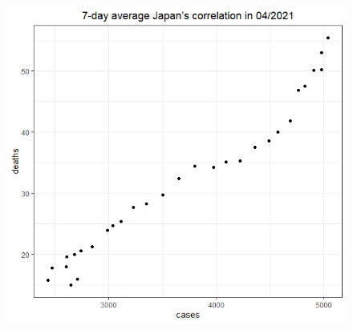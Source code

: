 \documentclass[english,10pt,table]{beamer}
\begin{document}
{\begin{figure}[H]
\begin{center}
        \includegraphics[scale = 0.2]{ix/ix.3/JPN_04_2021.png}
        

\end{center}
\end{figure}}
\end{document}
